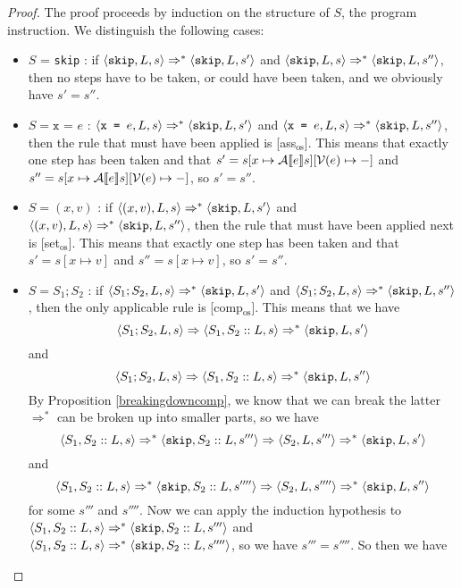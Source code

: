 \begin{proof}
The proof proceeds by induction on the structure of $S$, the program instruction. We distinguish the following cases:
\begin{itemize}[noitemsep]
    \item $S$ = \texttt{skip} : if $\langle \texttt{skip}, L, s \rangle \Rightarrow ^{*} \langle \texttt{skip}, L, s' \rangle$ and $\langle \texttt{skip}, L, s \rangle \Rightarrow ^{*} \langle \texttt{skip}, L, s'' \rangle$, then no steps have to be taken, or could have been taken, and we obviously have $s' = s''$.
    \item $S = \texttt{x = } e$ : $\langle \texttt{x = } e, L, s \rangle \Rightarrow ^{*} \langle \texttt{skip}, L, s' \rangle$ and $\langle \texttt{x = } e, L, s \rangle \Rightarrow ^{*} \langle \texttt{skip}, L, s'' \rangle$, then the rule that must have been applied is [ass$_{\textrm{os}}$]. This means that exactly one step has been taken and that $s'=s[x \mapsto \mathcal{A} \llbracket e \rrbracket s][\mathcal{V}(e)\mapsto-]$ and $s'' = s[x \mapsto \mathcal{A} \llbracket e \rrbracket s][\mathcal{V}(e)\mapsto-]$, so $s' = s''$.
    \item $S = (x,v)$ : if $\langle (x,v), L, s \rangle \Rightarrow ^{*} \langle \texttt{skip}, L, s' \rangle$ and $\langle (x,v), L, s \rangle \Rightarrow ^{*} \langle \texttt{skip}, L, s'' \rangle$, then the rule that must have been applied next is [set$_{\textrm{os}}$]. This means that exactly one step has been taken and that $s' = s[x\mapsto v]$ and $s'' = s[x\mapsto v]$, so $s' = s''$.
    \item $S = S_1; S_2$ : if $\langle S_1; S_2, L, s \rangle \Rightarrow ^{*} \langle \texttt{skip}, L, s' \rangle$ and $\langle S_1; S_2, L, s \rangle \Rightarrow ^{*} \langle \texttt{skip}, L, s'' \rangle$, then the only applicable rule is [comp$_{\textrm{os}}$]. This means that we have 
    $$\langle S_1; S_2, L, s \rangle \Rightarrow \langle S_1, S_2::L, s \rangle \Rightarrow ^{*} \langle \texttt{skip}, L, s' \rangle$$
    and 
    $$\langle S_1; S_2, L, s \rangle \Rightarrow \langle S_1, S_2::L, s \rangle  \Rightarrow ^{*} \langle \texttt{skip}, L, s'' \rangle$$
    By Proposition \ref{breakingdowncomp}, we know that we can break the latter $\Rightarrow ^{*}$ can be broken up into smaller parts, so we have 
     $$\langle S_1, S_2::L, s \rangle \Rightarrow ^{*} \langle \texttt{skip}, S_2::L, s''' \rangle \Rightarrow \langle S_2, L, s''' \rangle \Rightarrow ^{*} \langle \texttt{skip}, L, s' \rangle$$
     and
     $$\langle S_1, S_2::L, s \rangle \Rightarrow ^{*} \langle \texttt{skip}, S_2::L, s'''' \rangle \Rightarrow \langle S_2, L, s'''' \rangle \Rightarrow ^{*} \langle \texttt{skip}, L, s'' \rangle$$
     for some $s'''$ and $s''''$. Now we can apply the induction hypothesis to $\langle S_1, S_2::L, s \rangle \Rightarrow ^{*} \langle \texttt{skip}, S_2::L, s''' \rangle$ and $\langle S_1, S_2::L, s \rangle \Rightarrow ^{*} \langle \texttt{skip}, S_2::L, s'''' \rangle$, so we have $s''' = s''''$. So then we have 

\end{itemize}
\end{proof}
